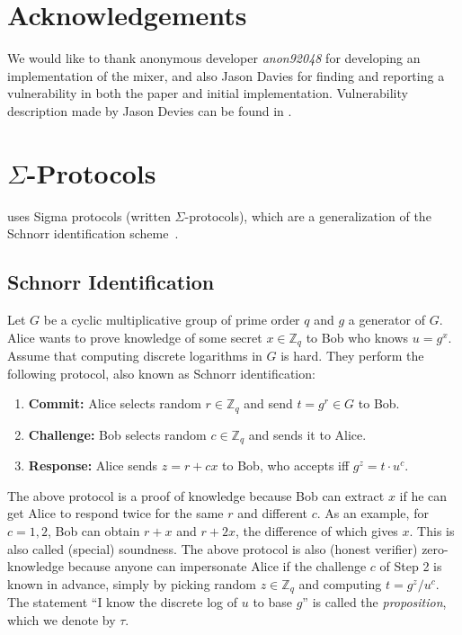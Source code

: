 \documentclass[runningheads]{llncs}
\begin{document}
\section*{Acknowledgements}

We would like to thank anonymous developer {\em anon92048} for developing an implementation of the mixer, and also Jason Davies
for finding and reporting a vulnerability in both the paper and initial implementation. Vulnerability description made by Jason Devies
can be found in \cite{ergomix-vuln}.



\appendix

\section{$\Sigma$-Protocols}
\label{intro:sigma}
\algname uses Sigma protocols (written $\Sigma$-protocols), which are a generalization of the Schnorr identification scheme~\cite{Sch91}. 

\subsection{Schnorr Identification}
 Let $G$ be a cyclic multiplicative group of prime order $q$ and $g$ a generator of $G$. Alice wants to prove knowledge of some secret $x\in \mathbb{Z}_q$ to Bob who knows $u = g^x$. Assume that computing discrete logarithms in $G$ is hard. They perform the following protocol, also known as Schnorr identification:

\begin{enumerate}
	\item \textbf{Commit:} Alice selects random $r\in \mathbb{Z}_q$ and send $t = g^r\in G$ to Bob.
	\item \textbf{Challenge:} Bob selects random $c\in\mathbb{Z}_q$ and sends it to Alice.
	\item \textbf{Response:} Alice sends $z = r + cx$ to Bob, who accepts iff $g^z = t\cdot u^c$.
\end{enumerate}

The above protocol is a proof of knowledge because Bob can extract $x$ if he can get Alice to respond twice for the same $r$ and different $c$. As an example, for $c = 1, 2$, Bob can obtain $r+x$ and $r+2x$, the difference of which gives $x$. This is also called (special) soundness. The above protocol is also (honest verifier) zero-knowledge because anyone can impersonate Alice if the challenge $c$ of Step 2 is known in advance, simply by picking random $z \in\mathbb{Z}_q$ and computing $t = g^z/u^c$. The statement ``I know the discrete log of $u$ to base $g$'' is called the {\em proposition}, which we denote by $\tau$.
\end{document}
